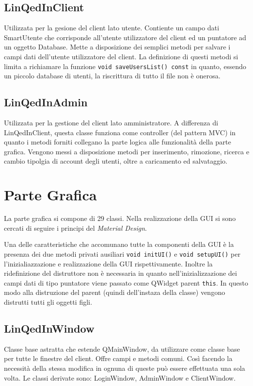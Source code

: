 \documentclass[a4paper]{article}
\begin{document}
\subsection*{LinQedInClient}
Utilizzata per la gesione del client lato utente. Contiente un campo dati SmartUtente che corrisponde all'utente utilizzatore del client ed un puntatore ad un oggetto Database. Mette a disposizione dei semplici metodi per salvare i campi dati dell'utente utilizzatore del client. La definizione di questi metodi si limita a richiamare la funzione \texttt{void saveUsersList() const} in quanto, essendo un piccolo database di utenti, la riscrittura di tutto il file non è onerosa.

\subsection*{LinQedInAdmin}
Utilizzata per la gestione del client lato amministratore. A differenza di LinQedInClient, questa classe funziona come controller (del pattern MVC) in quanto i metodi forniti collegano la parte logica alle funzionalità della parte grafica. Vengono messi a disposizione metodi per inserimento, rimozione, ricerca e cambio tipolgia di account degli utenti, oltre a caricamento ed salvataggio.

\section*{Parte Grafica}
La parte grafica si compone di 29 classi. Nella realizzazione della GUI si sono cercati di seguire i principi del \textit{Material Design}.

Una delle caratteristiche che accomunano tutte la componenti della GUI è la presenza dei due metodi privati ausiliari \texttt{void initUI()} e \texttt{void setupUI()} per l'inizialiazzazione e realizzazione della GUI rispettivamente. Inoltre la ridefinizione del distruttore non è necessaria in quanto nell'inizializzazione dei campi dati di tipo puntatore viene passato come QWidget parent \texttt{this}. In questo modo alla distruzione del parent (quindi dell'instaza della classe) vengono distrutti tutti gli oggetti figli.

\subsection*{LinQedInWindow}
Classe base astratta che estende QMainWindow, da utilizzare come classe base per tutte le finestre del client. Offre campi e metodi comuni. Così facendo la necessità della stessa modifica in ognuna di queste può essere effettuata una sola volta. Le classi derivate sono: LoginWindow, AdminWindow e ClientWindow.
\end{document}
